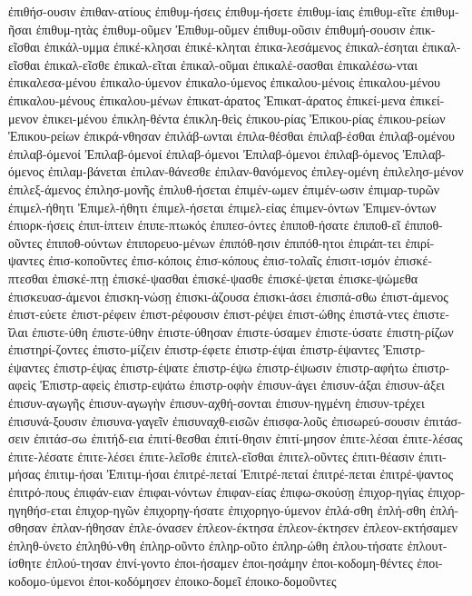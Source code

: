 {ἐπιθήσ-ουσιν
ἐπιθαν-ατίους
ἐπιθυμ-ήσεις
ἐπιθυμ-ήσετε
ἐπιθυμ-ίαις
ἐπιθυμ-εῖτε
ἐπιθυμ-ῆσαι
ἐπιθυμ-ητὰς
ἐπιθυμ-οῦμεν
Ἐπιθυμ-οῦμεν
ἐπιθυμ-οῦσιν
ἐπιθυμή-σουσιν
ἐπικ-εῖσθαι
ἐπικάλ-υμμα
ἐπικέ-κλησαι
ἐπικέ-κληται
ἐπικα-λεσάμενος
ἐπικαλ-έσηται
ἐπικαλ-εῖσθαι
ἐπικαλ-εῖσθε
ἐπικαλ-εῖται
ἐπικαλ-οῦμαι
ἐπικαλέ-σασθαι
ἐπικαλέσω-νται
ἐπικαλεσα-μένου
ἐπικαλο-ύμενον
ἐπικαλο-ύμενος
ἐπικαλου-μένοις
ἐπικαλου-μένου
ἐπικαλου-μένους
ἐπικαλου-μένων
ἐπικατ-άρατος
Ἐπικατ-άρατος
ἐπικεί-μενα
ἐπικεί-μενον
ἐπικει-μένου
ἐπικλη-θέντα
ἐπικλη-θεὶς
ἐπικου-ρίας
Ἐπικου-ρίας
ἐπικου-ρείων
Ἐπικου-ρείων
ἐπικρά-νθησαν
ἐπιλάβ-ωνται
ἐπιλα-θέσθαι
ἐπιλαβ-έσθαι
ἐπιλαβ-ομένου
ἐπιλαβ-όμενοί
Ἐπιλαβ-όμενοί
ἐπιλαβ-όμενοι
Ἐπιλαβ-όμενοι
ἐπιλαβ-όμενος
Ἐπιλαβ-όμενος
ἐπιλαμ-βάνεται
ἐπιλαν-θάνεσθε
ἐπιλαν-θανόμενος
ἐπιλεγ-ομένη
ἐπιλελησ-μένον
ἐπιλεξ-άμενος
ἐπιλησ-μονῆς
ἐπιλυθ-ήσεται
ἐπιμέν-ωμεν
ἐπιμέν-ωσιν
ἐπιμαρ-τυρῶν
ἐπιμελ-ήθητι
Ἐπιμελ-ήθητι
ἐπιμελ-ήσεται
ἐπιμελ-είας
ἐπιμεν-όντων
Ἐπιμεν-όντων
ἐπιορκ-ήσεις
ἐπιπ-ίπτειν
ἐπιπε-πτωκός
ἐπιπεσ-όντες
ἐπιποθ-ήσατε
ἐπιποθ-εῖ
ἐπιποθ-οῦντες
ἐπιποθ-ούντων
ἐπιπορευο-μένων
ἐπιπόθ-ησιν
ἐπιπόθ-ητοι
ἐπιράπ-τει
ἐπιρί-ψαντες
ἐπισ-κοποῦντες
ἐπισ-κόποις
ἐπισ-κόπους
ἐπισ-τολαῖς
ἐπισιτ-ισμόν
ἐπισκέ-πτεσθαι
ἐπισκέ-πτῃ
ἐπισκέ-ψασθαι
ἐπισκέ-ψασθε
ἐπισκέ-ψεται
ἐπισκε-ψώμεθα
ἐπισκευασ-άμενοι
ἐπισκη-νώσῃ
ἐπισκι-άζουσα
ἐπισκι-άσει
ἐπισπά-σθω
ἐπιστ-άμενος
ἐπιστ-εύετε
ἐπιστ-ρέφειν
ἐπιστ-ρέφουσιν
ἐπιστ-ρέψει
ἐπιστ-ώθης
ἐπιστά-ντες
ἐπιστε-ῖλαι
ἐπιστε-ύθη
ἐπιστε-ύθην
ἐπιστε-ύθησαν
ἐπιστε-ύσαμεν
ἐπιστε-ύσατε
ἐπιστη-ρίζων
ἐπιστηρί-ζοντες
ἐπιστο-μίζειν
ἐπιστρ-έφετε
ἐπιστρ-έψαι
ἐπιστρ-έψαντες
Ἐπιστρ-έψαντες
ἐπιστρ-έψας
ἐπιστρ-έψατε
ἐπιστρ-έψω
ἐπιστρ-έψωσιν
ἐπιστρ-αφήτω
ἐπιστρ-αφεὶς
Ἐπιστρ-αφεὶς
ἐπιστρ-εψάτω
ἐπιστρ-οφὴν
ἐπισυν-άγει
ἐπισυν-άξαι
ἐπισυν-άξει
ἐπισυν-αγωγῆς
ἐπισυν-αγωγὴν
ἐπισυν-αχθή-σονται
ἐπισυν-ηγμένη
ἐπισυν-τρέχει
ἐπισυνά-ξουσιν
ἐπισυνα-γαγεῖν
ἐπισυναχθ-εισῶν
ἐπισφα-λοῦς
ἐπισωρεύ-σουσιν
ἐπιτάσ-σειν
ἐπιτάσ-σω
ἐπιτήδ-εια
ἐπιτί-θεσθαι
ἐπιτί-θησιν
ἐπιτί-μησον
ἐπιτε-λέσαι
ἐπιτε-λέσας
ἐπιτε-λέσατε
ἐπιτε-λέσει
ἐπιτε-λεῖσθε
ἐπιτελ-εῖσθαι
ἐπιτελ-οῦντες
ἐπιτι-θέασιν
ἐπιτι-μήσας
ἐπιτιμ-ήσαι
Ἐπιτιμ-ήσαι
ἐπιτρέ-πεταί
Ἐπιτρέ-πεταί
ἐπιτρέ-πεται
ἐπιτρέ-ψαντος
ἐπιτρό-πους
ἐπιφάν-ειαν
ἐπιφαι-νόντων
ἐπιφαν-είας
ἐπιφω-σκούσῃ
ἐπιχορ-ηγίας
ἐπιχορ-ηγηθήσ-εται
ἐπιχορ-ηγῶν
ἐπιχορηγ-ήσατε
ἐπιχορηγο-ύμενον
ἐπλά-σθη
ἐπλή-σθη
ἐπλή-σθησαν
ἐπλαν-ήθησαν
ἐπλε-όνασεν
ἐπλεον-έκτησα
ἐπλεον-έκτησεν
ἐπλεον-εκτήσαμεν
ἐπληθ-ύνετο
ἐπληθύ-νθη
ἐπληρ-οῦντο
ἐπληρ-οῦτο
ἐπληρ-ώθη
ἐπλου-τήσατε
ἐπλουτ-ίσθητε
ἐπλού-τησαν
ἐπνί-γοντο
ἐποι-ήσαμεν
ἐποι-ησάμην
ἐποι-κοδομη-θέντες
ἐποι-κοδομο-ύμενοι
ἐποι-κοδόμησεν
ἐποικο-δομεῖ
ἐποικο-δομοῦντες
}
